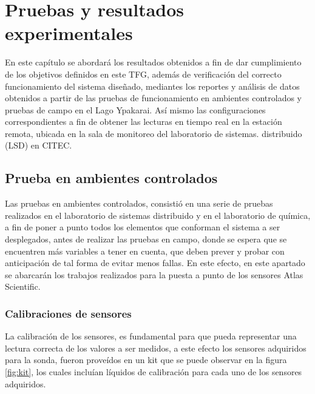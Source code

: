 \chapter[Pruebas y resultados experimentales]{ Pruebas y resultados experimentales}
\pagestyle{fancy}

En este cap\'itulo se abordar\'a los resultados obtenidos a fin de dar cumplimiento de los objetivos definidos en este TFG, adem\'as de verificación del correcto funcionamiento del sistema dise\~nado, mediantes los reportes y an\'alisis de datos obtenidos a partir de las  pruebas de funcionamiento en ambientes controlados y pruebas de campo en el Lago Ypakarai.  As\'i mismo  las configuraciones correspondientes a fin de obtener las lecturas en tiempo real en la estaci\'on remota, ubicada en la sala de monitoreo del laboratorio de sistemas. distribuido (LSD) en CITEC.
\section{Prueba en ambientes controlados}
Las pruebas en ambientes controlados, consisti\'o en una serie de pruebas realizados en el laboratorio de sistemas distribuido y en el laboratorio de qu\'imica, a fin de poner a punto todos los elementos que conforman el sistema a ser desplegados, antes de realizar las pruebas en campo, donde se espera que se encuentren m\'as variables a tener en cuenta, que deben prever y probar con anticipaci\'on de tal forma de evitar menos fallas.
En este efecto, en este apartado se abarcar\'an los trabajos realizados para la puesta a punto de los sensores Atlas Scientific.

\subsection{Calibraciones de sensores}
La calibraci\'on de los sensores, es fundamental para que pueda representar una lectura correcta de los valores a ser medidos, a este efecto los sensores adquiridos para la sonda, fueron prove\'idos en un kit que se puede observar en la figura \ref{fig:kit}, los cuales inclu\'ian l\'iquidos de calibraci\'on para cada uno de los sensores adquiridos. 

